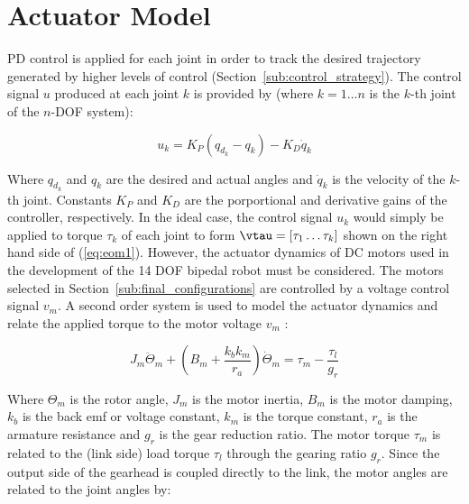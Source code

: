

\section{Actuator Model} %
\label{sec:actuator_model}
PD control is applied for each joint in order to track the desired trajectory generated by higher levels of control (Section~\ref{sub:control_strategy}). The control signal $u$ produced at each joint $k$ is provided by (where $k = 1 \ldots n$ is the $k$-th joint of the $n$-DOF system): 

\begin{equation}
	{u_k} = {K_P}({q_{d_k}} - {q_k}) - {K_D}{\dot q_k}
	\label{eq:pdcontrollaw}
\end{equation} 

Where ${q_{d_k}}$ and ${q_k}$ are the desired and actual angles and ${\dot q_k}$ is the velocity of the $k$-th joint. Constants ${K_P}$ and ${K_D}$ are the porportional and derivative gains of the controller, respectively. In the ideal case, the control signal ${u_k}$ would simply be applied to torque ${\tau _k}$ of each joint to form $\vtau = \left[\tau _1 \ldots \tau _k \right]$ shown on the right hand side of (\ref{eq:eom1}). However, the actuator dynamics of DC motors used in the development of the 14 DOF bipedal robot must be considered. The motors selected in Section~\ref{sub:final_configurations} are controlled by a voltage control signal $v_{m}$. A second order system is used to model the actuator dynamics and relate the applied torque to the motor voltage $v _m$ \cite{Spong2008}: 

\begin{equation}
	{J_m}{\ddot \Theta _m} + \left( {{B_m} + \frac{{{k_b}{k_m}}}{{{r_a}}}} \right)\dot \Theta _m  = {\tau _m} - \frac{{{\tau _l}}}{{{g_r}}}
	\label{eq:actdyn1}
\end{equation}

Where $\Theta _m$ is the rotor angle, $J_m$ is the motor inertia, $B_m$ is the motor damping, $k_b$ is the back emf or voltage constant, $k_m$ is the torque constant, $r_a$ is the armature resistance and $g_r$ is the gear reduction ratio. The motor torque $\tau _m$ is related to the (link side) load torque $\tau _l$ through the gearing ratio $g_r$. Since the output side of the gearhead is coupled directly to the link, the motor angles are related to the joint angles by: 

